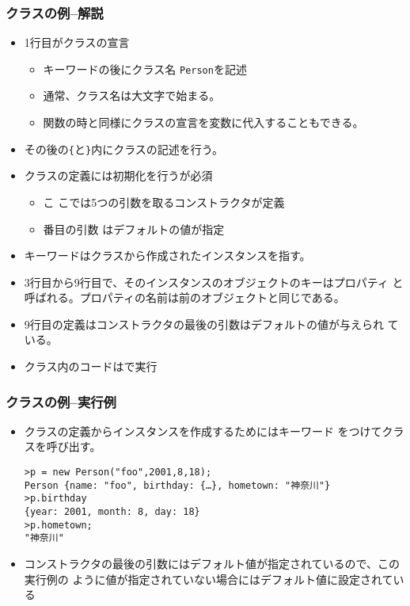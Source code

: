 \begin{frame}[containsverbatim]
 \frametitle{クラスの例--解説}
\begin{itemize}
 \item 1行目がクラスの宣言
       \begin{itemize}
        \item キーワードの後にクラス名
       \texttt{Person}を記述
        \item 通常、クラス名は大文字で始まる。
        \item 関数の時と同様にクラスの宣言を変数に代入することもできる。
       \end{itemize}
 \item その後の\Verb+{+と\Verb+}+内にクラスの記述を行う。
 \item クラスの定義には初期化を行うが必須
       \begin{itemize}
        \item こ
       こでは5つの引数を取るコンストラクタが定義
        \item 番目の引数
       はデフォルトの値が指定
       \end{itemize}
 \item キーワードはクラスから作成されたインスタンスを指す。
 \item 3行目から9行目で、そのインスタンスのオブジェクトのキーはプロパティ
			 と呼ばれる。プロパティの名前は前のオブジェクトと同じである。
 \item 9行目の定義はコンストラクタの最後の引数はデフォルトの値が与えられ
			 ている。
 \item クラス内のコードは\Strict で実行
\end{itemize}
\end{frame}
\begin{frame}[containsverbatim]
 \frametitle{クラスの例--実行例}
 \begin{itemize}
  \item クラスの定義からインスタンスを作成するためにはキーワード
        をつけてクラスを呼び出す。
        {\small
\begin{Verbatim}
>p = new Person("foo",2001,8,18);
Person {name: "foo", birthday: {…}, hometown: "神奈川"}
>p.birthday
{year: 2001, month: 8, day: 18}
>p.hometown;
"神奈川"
\end{Verbatim}
        }
  \item コンストラクタの最後の引数にはデフォルト値が指定されているので、この実行例の
ように値が指定されていない場合にはデフォルト値に設定されている
 \end{itemize}
\end{frame}

